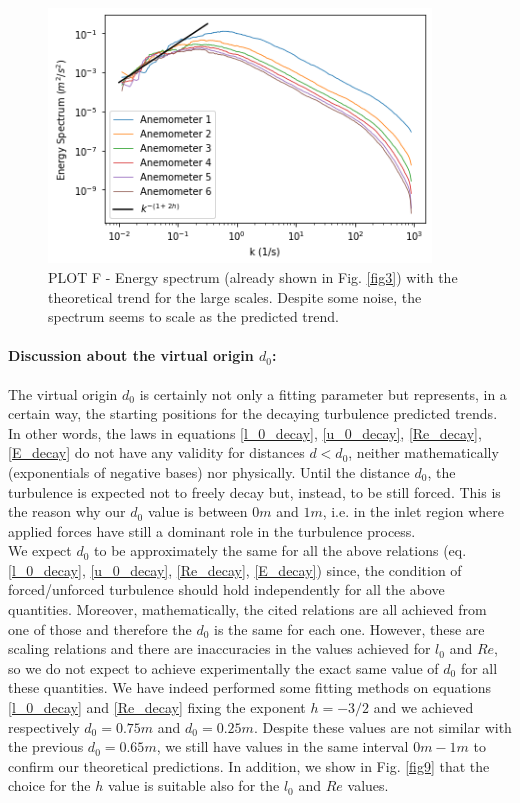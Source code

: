 \documentclass[11pt,titlepage]{article}
\begin{document}
 	\begin{center} 
 	\begin{figure} [h]
 		\centering
 		\includegraphics[width = 4in]{./figures/ex1_5_4.png}
 		\caption{PLOT F - Energy spectrum (already shown in Fig. \ref{fig3}) with the theoretical trend for the large scales. Despite some noise, the spectrum seems to scale as the predicted trend.}
 		\label{fig8}
 	\end{figure}
 \end{center}

\paragraph{Discussion about the virtual origin $d_0$:}
The virtual origin $d_0$ is certainly not only a fitting parameter but represents, in a certain way, the starting positions for the decaying turbulence predicted trends. In other words, the laws in equations \ref{l_0_decay}, \ref{u_0_decay}, \ref{Re_decay}, \ref{E_decay} do not have any validity for distances $d < d_0$, neither mathematically (exponentials of negative bases) nor physically. Until the distance $d_0$, the turbulence is expected not to freely decay but, instead, to be still forced. This is the reason why our $d_0$ value is between $0m$ and $1m$, i.e. in the inlet region where applied forces have still a dominant role in the turbulence process. \\
We expect $d_0$ to be approximately the same for all the above relations (eq. \ref{l_0_decay}, \ref{u_0_decay}, \ref{Re_decay}, \ref{E_decay}) since, the condition of forced/unforced turbulence should hold independently for all the above quantities. Moreover, mathematically, the cited relations are all achieved from one of those and therefore the $d_0$ is the same for each one. However, these are scaling relations and there are inaccuracies in the values achieved for $l_0$ and $Re$, so we do not expect to achieve experimentally the exact same value of $d_0$ for all these quantities. We have indeed performed some fitting methods on equations \ref{l_0_decay} and \ref{Re_decay} fixing the exponent $h=-3/2$ and we achieved respectively $d_0 = 0.75m$ and $d_0 = 0.25m$. Despite these values are not similar with the previous $d_0 = 0.65m$, we still have values in the same interval $0m-1m$ to confirm our theoretical predictions. In addition, we show in Fig. \ref{fig9} that the choice for the $h$ value is suitable also for the $l_0$ and $Re$ values.
\end{document}
